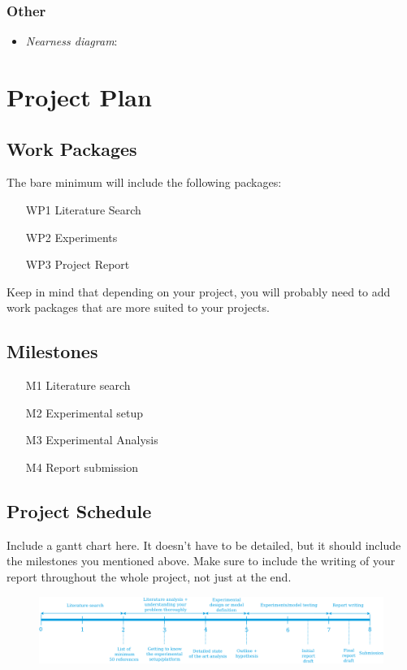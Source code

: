 \documentclass[rnd]{mas_proposal}
\begin{document}
\subsection{Other}
\begin{itemize}
    \item \textit{Nearness diagram}: \cite{minguez2004nearness}
\end{itemize}


\chapter{Project Plan}

\section{Work Packages}
The bare minimum will include the following packages:
\begin{enumerate}
    \item[WP1] Literature Search
    \item[WP2] Experiments
    \item[WP3] Project Report
\end{enumerate}
Keep in mind that depending on your project, you will probably need to add work packages that are more suited to your projects.

\section{Milestones}
\begin{enumerate}
    \item[M1] Literature search
    \item[M2] Experimental setup
    \item[M3] Experimental Analysis
    \item[M4] Report submission
\end{enumerate}

\section{Project Schedule}
Include a gantt chart here. It doesn't have to be detailed, but it should include the milestones you mentioned above.
Make sure to include the writing of your report throughout the whole project, not just at the end.

\begin{figure}[h!]
    \includegraphics[width=\textwidth]{rnd_deliverable_timeline}
    \caption{}
    \label{}
\end{figure}
\end{document}
